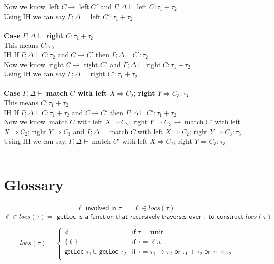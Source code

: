 \documentclass{article}
\begin{document}
Now we know, left $C \to$ left $C'$ and $\Gamma; \Delta \vdash$ left $C : \tau_1+\tau_2$ \\
Using IH we can say $\Gamma; \Delta \vdash$ left $ C' : \tau_1+\tau_2$ \\\\
\textbf{Case $\Gamma; \Delta \vdash$ right $C : \tau_1+\tau_2$ } \\
This means $C : \tau_2$ \\
IH If $\Gamma; \Delta \vdash C : \tau_2$ and  $C \to C'$ then $\Gamma; \Delta \vdash C' : \tau_2$ \\
Now we know, right $C \to$ right $C'$ and $\Gamma; \Delta \vdash$ right $C : \tau_1+\tau_2$ \\
Using IH we can say $\Gamma;\Delta \vdash$ right $ C' : \tau_1+\tau_2$ \\\\
\textbf{Case $\Gamma;\Delta \vdash$ match $C$ with left $X \Rightarrow C_2 $; right $ Y \Rightarrow C_3 : \tau_3$ } \\
This means $C : \tau_1 + \tau_2$ \\
IH If $\Gamma;\Delta \vdash C : \tau_1+\tau_2$ and  $C \to C'$ then $\Gamma; \Delta \vdash C' : \tau_1+\tau_2$ \\
Now we know, match $C$ with left $X \Rightarrow C_2 $; right $ Y \Rightarrow C_3 \to$
match $C'$ with left $X \Rightarrow C_2 $; right $ Y \Rightarrow C_3$ and $\Gamma; \Delta \vdash$ match $C$ with left $X \Rightarrow C_2 $; right $ Y \Rightarrow C_3 : \tau_3$ \\
Using IH we can say, $\Gamma; \Delta \vdash$ match $C'$ with left $X \Rightarrow C_2 $; right $ Y \Rightarrow C_3 : \tau_3$ \\\\



\section{Glossary}
$$
\ell \textsf{ involved in } \tau = 
    \begin{array}{l}
    \ell \in locs (\tau)
    \end{array}
$$
$$
 \ell \in locs (\tau) = \textsf{ getLoc is a function that recursively traverses over } \tau \textsf{ to construct } locs (\tau)
$$

$$
 locs (\tau) = \left\{
    \begin{array}{ll}
    \phi & \textsf{if } \tau = \textbf{unit}\\
    \{\ell\} & \textsf{if } \tau = \ell.e\\
        \textsf{getLoc } \tau_1 \cup \textsf{getLoc } \tau_2 & \textsf{if } \tau = \tau_1 \to \tau_2 \textsf{ or } \tau_1 + \tau_2 \textsf{ or } \tau_1 \times \tau_2 \\
    \end{array}
\right.
$$
\end{document}
